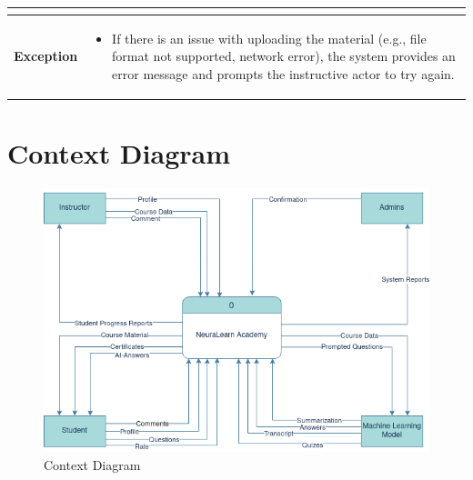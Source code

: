 \begin{table}[h!]
\begin{tabular}{|m{4cm}|m{11cm}|}
\begin{itemize}[noitemsep,topsep=0pt]
        \end{itemize} \\
        \hline
        \textbf{Exception} & 
        \begin{itemize}[noitemsep,topsep=0pt]
            \item If there is an issue with uploading the material (e.g., file format not supported, network error), the system provides an error message and prompts the instructive actor to try again.
        \end{itemize} \\
        \hline
    \end{tabular}
    \egroup
\end{table}

\newpage

\section{Context Diagram}
\begin{figure}[h!]
	\centering
	\includegraphics[max height=\textheight,max width=\textwidth]{figures/Context-Diagram.png}
	\caption{Context Diagram}
\end{figure}

\newpage


